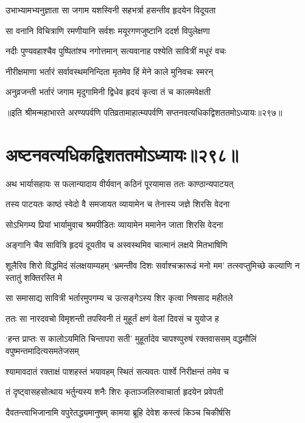 \twolineshloka
{उभाभ्यामभ्यनुज्ञाता सा जगाम यशस्विनी}
{सहभर्त्रा हसन्तीव हृदयेन विदूयता}


\twolineshloka
{सा वनानि विचित्राणि रमणीयानि सर्वशः}
{मयूरगणजुष्टानि ददर्श विपुलेक्षणा}


\twolineshloka
{नदीः पुण्यवहाश्चैव पुष्पितांश्च नगोत्तमान्}
{सत्यवानाह पश्येति सावित्रीं मधूरं वचः}


\twolineshloka
{नीरीक्षमाणा भर्तारं सर्वावस्थमनिन्दिता}
{मृतमेव हिं मेने काले मुनिवचः स्मरन्}


\twolineshloka
{अनुव्रजन्ती भर्तारं जगाम मृदुगामिनी}
{द्विधेव हृदयं कृत्वा तं च कालमवेक्षती}


॥इति श्रीमन्महाभारते अरण्यपर्वणि पतिव्रतामाहात्म्यपर्वणि सप्तनवत्यधिकद्विशततमोऽध्यायः॥२९७॥


\chapter{अष्टनवत्यधिकद्विशततमोऽध्यायः॥२९८॥}


\twolineshloka
{अथ भार्यासहायः स फलान्यादाय वीर्यवान्}
{कठिनं पूरयामास ततः काण्ठान्यपाटयत्}


\twolineshloka
{तस्य पाटयतः काष्ठं स्वेदो वै समजायत}
{व्यायामेन च तेनास्य जज्ञे शिरसि वेदना}


\twolineshloka
{सोऽभिगम्य प्रियां भार्यामुवाच श्रमपीडितः}
{व्यायामेन ममानेन जाता शिरसि वेदना}


\twolineshloka
{अङ्गानि चैव सावित्रि हृदयं दूयतीव च}
{अस्वस्थमिव चात्मानं लक्षये मितभाषिणि}


\threelineshloka
{शूलैरिव शिरो विद्धमिदं संलक्षयाम्यहम्}
{`भ्रमन्तीव दिशः सर्वाश्चक्रारूढं मनो मम'}
{तत्स्वप्तुमिच्छे कल्याणि न स्तातुं शक्तिरस्ति मे}


\twolineshloka
{सा समासाद्य सावित्री भर्तारमुपगम्य च}
{उत्सङ्गेऽस्य शिर कृत्वा निषसाद महीतले}


\twolineshloka
{ततः सा नारदवचो विमृशन्ती तपस्विनी}
{तं मुहूर्तं क्षणं वेलां दिवसं च युयोज ह}


\threelineshloka
{`हन्त प्राप्तः स कालोऽयमिति चिन्तापरा सती'}
{मुहूर्तादेव चापश्य्पुरुषं रक्तवाससम्}
{वद्धमौलिं वपुष्मन्तमादित्यसमतेजसम्}


\twolineshloka
{श्यामावदातं रक्ताक्षं पाशहस्तं भयावहम्}
{स्थितं सत्यवतः पार्श्वे निरीक्षन्तं तमेव च}


\twolineshloka
{तं दृष्ट्वासहसोत्थाय भर्तुन्यस्य शनैः शिरः}
{कृताञ्जलिरुवाचार्ता हृदयेन प्रवेपती}


\twolineshloka
{दैवतन्त्वाभिजानामि वपुरेतद्ध्यमानुषम्}
{कामया ब्रूहि देवेश कस्त्वं किञ्च चिकीर्षसि}

